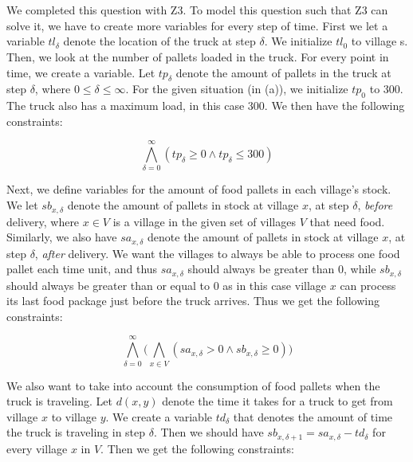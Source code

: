 \chapter{}\label{chp:1}
We completed this question with Z3. To model this question such that Z3 can solve it, we have to create more variables for every step of time. First we let a variable $tl_{\delta}$ denote the location of the truck at step $\delta$. We initialize $tl_0$ to village s. Then, we look at the number of pallets loaded in the truck. For every point in time, we create a variable. Let $tp_{\delta}$ denote the amount of pallets in the truck at step $\delta$, where $0 \leq \delta \leq \infty$. For the given situation (in (a)), we initialize $tp_0$ to 300. The truck also has a maximum load, in this case 300. We then have the following constraints:

\begin{equation}
    \label{eqn:5_maxload}
    \bigwedge^{\infty}_{\delta=0} (tp_{\delta} \geq 0 \wedge tp_{\delta} \leq 300)
\end{equation}

Next, we define variables for the amount of food pallets in each village's stock. We let $sb_{x,\delta}$ denote the amount of pallets in stock at village $x$, at step $\delta$, \textit{before} delivery, where $x \in V$ is a village in the given set of villages $V$ that need food. Similarly, we also have $sa_{x,\delta}$ denote the amount of pallets in stock at village $x$, at step $\delta$, \textit{after} delivery. We want the villages to always be able to process one food pallet each time unit, and thus $sa_{x, \delta}$ should always be greater than 0, while $sb_{x, \delta}$ should always be greater than or equal to 0 as in this case village $x$ can process its last food package just before the truck arrives. Thus we get the following constraints:

\begin{equation}
    \label{eqn:5_minfood}
    \bigwedge^{\infty}_{\delta=0}\bigg(\bigwedge_{x \in V} (sa_{x, \delta} > 0 \wedge sb_{x, \delta} \geq 0)\bigg)
\end{equation}

We also want to take into account the consumption of food pallets when the truck is traveling. Let $d(x,y)$ denote the time it takes for a truck to get from village $x$ to village $y$. We create a variable $td_{\delta}$ that denotes the amount of time the truck is traveling in step $\delta$. Then we should have $sb_{x, \delta+1} = sa_{x, \delta} - td_{\delta}$ for every village $x$ in $V$. Then we get the following constraints:

